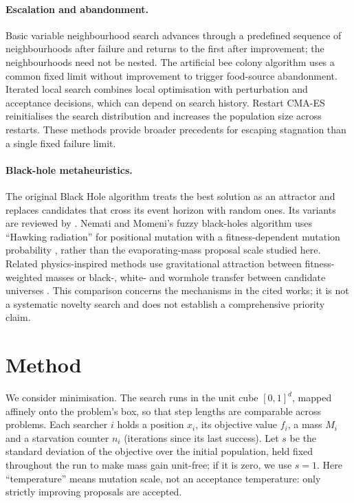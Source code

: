 \documentclass[10pt,a4paper]{article}
\begin{document}
\paragraph{Escalation and abandonment.} Basic variable neighbourhood search
\citep{mladenovic1997} advances through a predefined sequence of neighbourhoods
after failure and returns to the first after improvement; the neighbourhoods
need not be nested. The artificial bee colony algorithm \citep{karaboga2007}
uses a common fixed limit without improvement to trigger food-source abandonment.
Iterated local search \citep{lourenco2003} combines
local optimisation with perturbation and acceptance decisions, which can depend
on search history. Restart CMA-ES \citep{auger2005} reinitialises the search
distribution and increases the population size across restarts. These methods
provide broader precedents for escaping stagnation than a single fixed failure limit.

\paragraph{Black-hole metaheuristics.} The original Black Hole algorithm
\citep{hatamlou2013} treats the best solution as an attractor and replaces
candidates that cross its event horizon with random ones. Its variants are
reviewed by \citet{abualigah2022}. Nemati and Momeni's fuzzy black-holes algorithm
uses ``Hawking radiation'' for positional mutation with a fitness-dependent
mutation probability \citep{nemati2014}, rather than the evaporating-mass
proposal scale studied here. Related physics-inspired methods use gravitational attraction between
fitness-weighted masses \citep{rashedi2009} or black-, white- and wormhole transfer
between candidate universes \citep{mirjalili2016}. This comparison concerns the
mechanisms in the cited works; it is not a systematic novelty search and does
not establish a comprehensive priority claim.

\section{Method}
\label{sec:method}

We consider minimisation. The search runs in the unit cube $[0,1]^d$, mapped affinely onto the problem's box,
so that step lengths are comparable across problems. Each searcher $i$ holds a
position $x_i$, its objective value $f_i$, a mass $M_i$ and a starvation counter
$n_i$ (iterations since its last success). Let $s$ be the standard deviation of the
objective over the initial population, held fixed throughout the run to make mass gain unit-free; if it is zero, we use
$s=1$. Here ``temperature'' means mutation scale, not an acceptance temperature:
only strictly improving proposals are accepted.
\end{document}
